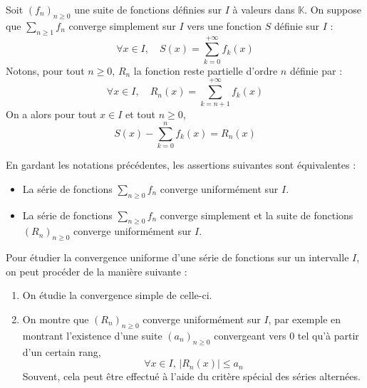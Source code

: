 \documentclass[french,11pt,twoside]{VcCours}
\begin{document}
\medskip

Soit $(f_n)_{n \geq 0}$ une suite de fonctions définies sur $I$ à valeurs dans $\mathbb{K}$. On suppose que $\sum_{n \geq 1} f_n$ converge simplement sur $I$ vers une fonction $S$ définie sur $I$ :
$$ \forall x \in I, \quad S(x) = \sum_{k=0}^{+ \infty} f_k(x)$$
Notons, pour tout $n \geq 0$, $R_n$ la fonction reste partielle d'ordre $n$ définie par :
$$ \forall x \in I, \quad R_n(x) = \sum_{k=n+1}^{+ \infty} f_k(x)$$
On a alors pour tout $x \in I$ et tout $n \geq 0$,
$$ S(x) - \sum_{k=0}^n f_k(x) = R_n(x)$$

\begin{Proposition}{}\label{CritCVU} En gardant les notations précédentes, les assertions suivantes sont équivalentes :

\begin{itemize}
\item La série de fonctions $\sum_{n \geq 0} f_n$ converge uniformément sur $I$.
\item La série de fonctions $\sum_{n \geq 0} f_n$ converge simplement et la suite de fonctions $(R_n)_{n \geq 0}$ converge uniformément sur $I$.
\end{itemize}
\end{Proposition}

\begin{Methode}{} Pour étudier la convergence uniforme d'une série de fonctions sur un intervalle $I$, on peut procéder de la manière suivante :
\begin{enumerate}
\item On étudie la convergence simple de celle-ci.
\item On montre que $(R_n)_{n \geq 0}$ converge uniformément sur $I$, par exemple en montrant l'existence d'une suite $(a_n)_{n \geq 0}$ convergeant vers $0$ tel qu'à partir d'un certain rang,
$$ \forall x \in I, \, \vert R_n(x) \vert \leq a_n $$
Souvent, cela peut être effectué à l'aide du critère spécial des séries alternées.
\end{enumerate}
\end{Methode}
\end{document}
